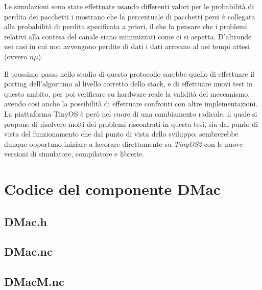 \documentclass[twoside,11pt,a4paper,italian,openany]{book}
\begin{document}
Le simulazioni sono state effettuate usando differenti valori per le probabilità di perdita 
dei pacchetti i mostrano che la percentuale di pacchetti persi è collegata  
alla probabilità di perdita specificata a priori, il che fa pensare che i problemi relativi alla contesa del canale siano minimizzati come ci si aspetta. D'altronde nei casi in cui non avvengono
perdite di dati i dati arrivano al \sink nei tempi attesi (ovvero $n\mu$).  


Il prossimo passo nello studio di questo protocollo sarebbe quello di effettuare il 
porting dell'algoritmo al livello corretto dello stack, e di effettuare nuovi test in questo 
ambito, per poi verificare su hardware reale la validità del meccanismo, avendo così anche la 
possibilità di effettuare confronti con altre implementazioni. 
La piattaforma TinyOS è però nel cuore di una cambiamento radicale\cite{tos2}, il quale 
si propone di risolvere molti dei problemi riscontrati in questa tesi, sia dal punto di vista 
del funzionamento che dal punto di vista dello sviluppo; sembrerebbe dunque opportuno 
iniziare a lavorare direttamente su \emph{TinyOS2} con le nuove versioni di simulatore, 
compilatore e librerie. 

\appendix
\lstset{
  basicstyle=\small,
  numbers=left, 
  stepnumber=5, 
  numbersep=8pt,
  frame=L,
  }
\chapter{Codice del componente DMac}
\section{DMac.h}

\section{DMac.nc}

\section{DMacM.nc}

\end{document}

